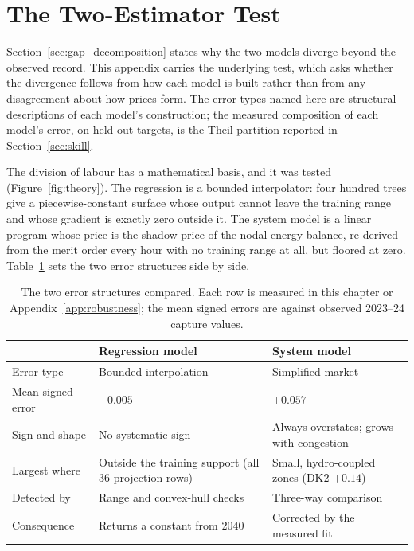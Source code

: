 \section{The Two-Estimator Test}\label{app:two_estimators}

Section~\ref{sec:gap_decomposition} states why the two models diverge beyond
the observed record. This appendix carries the underlying test, which asks
whether the divergence follows from how each model is built rather than from
any disagreement about how prices form. The error types named here are
structural descriptions of each model's construction; the measured composition
of each model's error, on held-out targets, is the Theil partition reported in
Section~\ref{sec:skill}.


The division of labour has a mathematical basis, and it was tested
(Figure~\ref{fig:theory}). The regression is a bounded interpolator: four
hundred trees give a piecewise-constant surface whose output cannot leave the
training range and whose gradient is exactly zero outside it. The system
model is a linear program whose price is the shadow price of the nodal energy
balance, re-derived from the merit order every hour with no training range at
all, but floored at zero. Table~\ref{tab:error_anatomy} sets the two error
structures side by side.

\begin{table}[!htb]
\centering\small
\caption{The two error structures compared. Each row is measured in this
chapter or Appendix~\ref{app:robustness}; the mean signed errors are against
observed 2023--24 capture values.}
\label{tab:error_anatomy}
\begin{tabular}{p{3.2cm} p{5.3cm} p{5.3cm}}
\toprule
 & \textbf{Regression model} & \textbf{System model} \\
\midrule
Error type & Bounded interpolation & Simplified market \\
Mean signed error & $-0.005$ & $+0.057$ \\
Sign and shape & No systematic sign & Always overstates; grows with
congestion \\
Largest where & Outside the training support (all 36 projection rows) & Small,
hydro-coupled zones (DK2 $+0.14$) \\
Detected by & Range and convex-hull checks & Three-way comparison \\
Consequence & Returns a constant from 2040 & Corrected by the measured fit \\
\bottomrule
\end{tabular}
\end{table}


